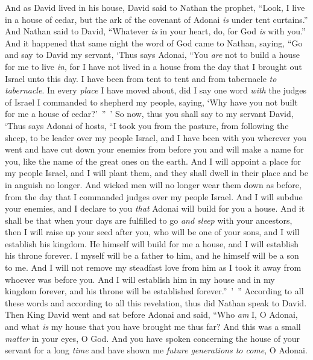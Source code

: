 \begin{biblechapter} %
 And as David lived in his house, David said to Nathan the prophet, “Look, I live in a house of cedar, but the ark of the covenant of Adonai \textit{is} under tent curtains.”
\verse And Nathan said to David, “Whatever \textit{is} in your heart, do, for God \textit{is} with you.”
\verse And it happened that same night the word of God came to Nathan, saying,
\verse “Go and say to David my servant, ‘Thus says Adonai, “You \textit{are} not to build a house for me to live \textit{in},
\verse for I have not lived in a house from the day that I brought out Israel unto this day. I have been from tent to tent and from tabernacle \textit{to tabernacle}.
\verse In every \textit{place} I have moved about, did I say one word \textit{with} the judges of Israel I commanded to shepherd my people, saying, ‘Why have you not built for me a house of cedar?’ ” ’
\verse So now, thus you shall say to my servant David, ‘Thus says Adonai of hosts, “I took you from the pasture, from following the sheep, to be leader over my people Israel,
\verse and I have been with you wherever you went and have cut down your enemies from before you and will make a name for you, like the name of the great ones on the earth.
\verse And I will appoint a place for my people Israel, and I will plant them, and they shall dwell in their place and be in anguish no longer. And wicked men will no longer wear them down as before,
\verse from the day that I commanded judges over my people Israel. And I will subdue your enemies, and I declare to you \textit{that} Adonai will build for you a house.
\verse And it shall be that when your days are fulfilled to go \textit{and sleep} with your ancestors, then I will raise up your seed after you, who will be one of your sons, and I will establish his kingdom.
\verse He himself will build for me a house, and I will establish his throne forever.
\verse I myself will be a father to him, and he himself will be a son to me. And I will not remove my steadfast love from him as I took it away from whoever was before you.
\verse And I will establish him in my house and in my kingdom forever, and his throne will be established forever.” ’ ”
\verse According to all these words and according to all this revelation, thus did Nathan speak to David.
 Then King David went and sat before Adonai and said, “Who \textit{am} I, O Adonai, and what \textit{is} my house that you have brought me thus far?
\verse And this was a small \textit{matter} in your eyes, O God. And you have spoken concerning the house of your servant for a long \textit{time} and have shown me \textit{future generations to come}, O Adonai.

\end{biblechapter}
